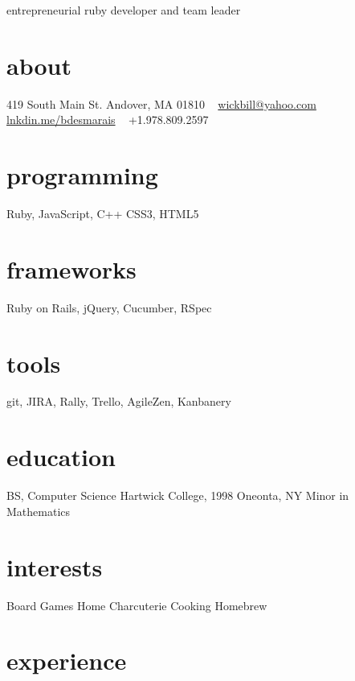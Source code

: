 \documentclass[]{friggeri-cv}
\begin{document}
       {entrepreneurial ruby developer and team leader}
       
\begin{aside}
  \section{about}
    419 South Main St.
    Andover, MA 01810
    ~
    \href{mailto:wickbill@yahoo.com}{wickbill@yahoo.com}
    \href{http:/lnkdin.me/bdesmarais}{lnkdin.me/bdesmarais}
    ~
    +1.978.809.2597
  \section{programming}
    Ruby, JavaScript, C++
    CSS3, HTML5
  \section{frameworks}
  Ruby on Rails, jQuery, Cucumber, RSpec
  \section{tools}
  git, JIRA, Rally, Trello, AgileZen, Kanbanery
  \section{education}
    BS, Computer Science
    Hartwick College, 1998
    Oneonta, NY
    Minor in Mathematics
  \section{interests}
  Board Games
  Home Charcuterie
  Cooking
  Homebrew
\end{aside}

\section{experience}
\end{document}
